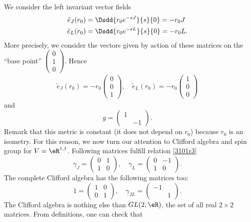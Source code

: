 We consider the left invariant vector fields
\begin{subequations}
	\begin{align}
		\tilde{e}_J(r_0) & =\Dsdd{ r_0 e^{-sJ} }{s}{0}=-r_0J  \\
		\tilde{e}_L(r_0) & =\Dsdd{ r_0 e^{-sL} }{s}{0}=-r_0L.
	\end{align}
\end{subequations}
More precisely, we consider the vectors given by action of these matrices on the ``base point'' $\begin{pmatrix}
		0 \\1\\0
	\end{pmatrix}$. Hence
\begin{align}
	\tilde{e}_J(r_0)=-r_0\begin{pmatrix}
		                     0 \\0\\1
	                     \end{pmatrix},\quad
	\tilde{e}_L(r_0)=-r_0\begin{pmatrix}
		                     1 \\0\\0
	                     \end{pmatrix}
\end{align}
and
\[
	g=\begin{pmatrix}
		1 \\&-1
	\end{pmatrix}.
\]
Remark that this metric is constant (it does not depend on $r_0$) because $r_0$ is an isometry. For this reason, we now turn our attention to Clifford algebra and spin group for $V=\eR^{1,1}$. Following matrices fulfill relation \eqref{3101r3}
\[
	\gamma_J=\begin{pmatrix}
		0 & 1 \\1&0
	\end{pmatrix},\quad
	\gamma_L=\begin{pmatrix}
		0 & -1 \\1&0
	\end{pmatrix}.
\]
The complete Clifford algebra has the following matrices too:
\[
	1=\begin{pmatrix}
		1 & 0 \\0&1
	\end{pmatrix},\quad
	\gamma_{JL}=\begin{pmatrix}
		-1 \\&1
	\end{pmatrix}.
\]
The Clifford algebra is nothing else than $GL(2,\eR)$, the set of all real $2\times 2$ matrices. From definitions, one can check that
